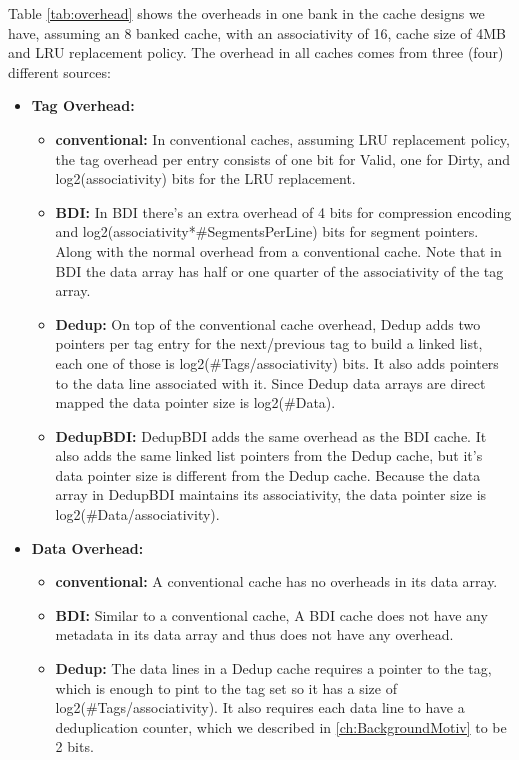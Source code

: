 Table \ref{tab:overhead} shows the overheads in one bank in the cache designs we have, assuming an 8 banked cache, with an associativity of 16, cache size of 4MB and LRU replacement policy. The overhead in all caches comes from three (four) different sources:
\begin{itemize}
    \item \textbf{Tag Overhead:}
    \begin{itemize}
        \item \textbf{conventional:} In conventional caches, assuming LRU replacement policy, the tag overhead per entry consists of one bit for Valid, one for Dirty, and log2(associativity) bits for the LRU replacement. 
        \item \textbf{BDI:} In BDI there's an extra overhead of 4 bits for compression encoding and log2(associativity*\#SegmentsPerLine) bits for segment pointers. Along with the normal overhead from a conventional cache. Note that in BDI the data array has half or one quarter of the associativity of the tag array.
        \item \textbf{Dedup:} On top of the conventional cache overhead, Dedup adds two pointers per tag entry for the next/previous tag to build a linked list, each one of those is log2(\#Tags/associativity) bits. It also adds pointers to the data line associated with it. Since Dedup data arrays are direct mapped the data pointer size is log2(\#Data).
        \item \textbf{DedupBDI:} DedupBDI adds the same overhead as the BDI cache. It also adds the same linked list pointers from the Dedup cache, but it's data pointer size is different from the Dedup cache. Because the data array in DedupBDI maintains its associativity, the data pointer size is log2(\#Data/associativity).
    \end{itemize}
    \item \textbf{Data Overhead:}
    \begin{itemize}
        \item \textbf{conventional:} A conventional cache has no overheads in its data array.
        \item \textbf{BDI:} Similar to a conventional cache, A BDI cache does not have any metadata in its data array and thus does not have any overhead.
        \item \textbf{Dedup:} The data lines in a Dedup cache requires a pointer to the tag, which is enough to pint to the tag set so it has a size of log2(\#Tags/associativity). It also requires each data line to have a deduplication counter, which we described in \ref{ch:BackgroundMotiv} to be 2 bits.

\end{itemize}
\end{itemize}
